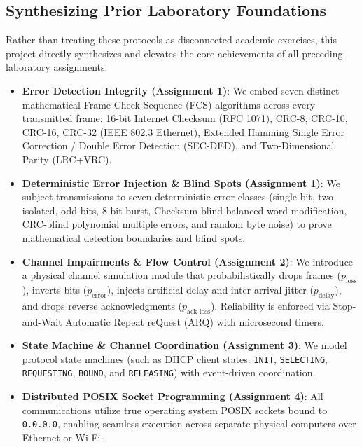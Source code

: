 \documentclass[12pt, a4paper]{article}
\begin{document}
\subsection{Synthesizing Prior Laboratory Foundations}
Rather than treating these protocols as disconnected academic exercises, this project directly synthesizes and elevates the core achievements of all preceding laboratory assignments:
\begin{itemize}
    \item \textbf{Error Detection Integrity (Assignment 1)}: We embed seven distinct mathematical Frame Check Sequence (FCS) algorithms across every transmitted frame: 16-bit Internet Checksum (RFC 1071), CRC-8, CRC-10, CRC-16, CRC-32 (IEEE 802.3 Ethernet), Extended Hamming Single Error Correction / Double Error Detection (SEC-DED), and Two-Dimensional Parity (LRC+VRC).
    \item \textbf{Deterministic Error Injection \& Blind Spots (Assignment 1)}: We subject transmissions to seven deterministic error classes (single-bit, two-isolated, odd-bits, 8-bit burst, Checksum-blind balanced word modification, CRC-blind polynomial multiple errors, and random byte noise) to prove mathematical detection boundaries and blind spots.
    \item \textbf{Channel Impairments \& Flow Control (Assignment 2)}: We introduce a physical channel simulation module that probabilistically drops frames ($p_{\text{loss}}$), inverts bits ($p_{\text{error}}$), injects artificial delay and inter-arrival jitter ($p_{\text{delay}}$), and drops reverse acknowledgments ($p_{\text{ack\_loss}}$). Reliability is enforced via Stop-and-Wait Automatic Repeat reQuest (ARQ) with microsecond timers.
    \item \textbf{State Machine \& Channel Coordination (Assignment 3)}: We model protocol state machines (such as DHCP client states: \texttt{INIT}, \texttt{SELECTING}, \texttt{REQUESTING}, \texttt{BOUND}, and \texttt{RELEASING}) with event-driven coordination.
    \item \textbf{Distributed POSIX Socket Programming (Assignment 4)}: All communications utilize true operating system POSIX sockets bound to \texttt{0.0.0.0}, enabling seamless execution across separate physical computers over Ethernet or Wi-Fi.
\end{itemize}

\end{document}
